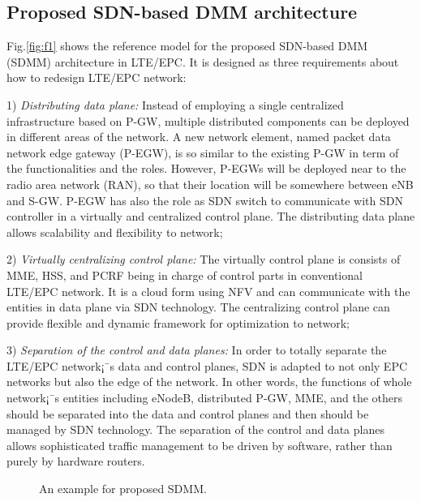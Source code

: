 \documentclass[runningheads,a4paper]{llncs}
\begin{document}
\subsection{Proposed SDN-based DMM architecture}
Fig.\ref{fig:f1} shows the reference model for the proposed SDN-based DMM (SDMM) architecture in LTE/EPC. It is designed as three requirements about how to redesign LTE/EPC network:

    1) \textit{Distributing data plane:} Instead of employing a single centralized infrastructure based on P-GW, multiple distributed components can be deployed in different areas of the network. A new network element, named packet data network edge gateway (P-EGW), is so similar to the existing P-GW in term of the functionalities and the roles. However, P-EGWs will be deployed near to the radio area network (RAN), so that their location will be somewhere between eNB and S-GW. P-EGW has also the role as SDN switch to communicate with SDN controller in a virtually and centralized control plane. The distributing data plane allows scalability and flexibility to network;

    2) \textit{Virtually centralizing control plane:} The virtually control plane is consists of MME, HSS, and PCRF being in charge of control parts in conventional LTE/EPC network. It is a cloud form using NFV and can communicate with the entities in data plane via SDN technology. The centralizing control plane can provide flexible and dynamic framework for optimization to network;

    3) \textit{Separation of the control and data planes:} In order to totally separate the LTE/EPC network¡¯s data and control planes, SDN is adapted to not only EPC networks but also the edge of the network. In other words, the functions of whole network¡¯s entities including eNodeB, distributed P-GW, MME, and the others should be separated into the data and control planes and then should be managed by SDN technology. The separation of the control and data planes allows sophisticated traffic management to be driven by software, rather than purely by hardware routers.

\begin{figure}[t]
    \centering
    \caption{An example for proposed SDMM.}
    \label{fig:2}
\end{figure}
\end{document}

